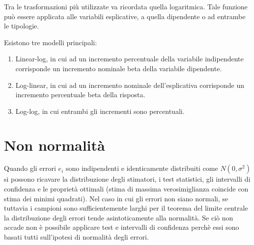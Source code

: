 \documentclass[a4page, 11pt]{article}
\begin{document}
Tra le trasformazioni più utilizzate va ricordata quella logaritmica. Tale funzione può essere applicata alle variabili esplicative, a quella dipendente o ad entrambe le tipologie. 

Esistono tre modelli principali: %
\begin{enumerate}[noitemsep]
\item Linear-log, in cui ad un incremento percentuale della variabile indipendente corrisponde un incremento nominale beta della variabile dipendente.
\item Log-linear, in cui ad un incremento nominale dell’esplicativa corrisponde un incremento percentuale beta della risposta.
\item Log-log, in cui entrambi gli incrementi sono percentuali.
\end{enumerate}

\section{Non normalità}

Quando gli errori $e_i$ sono indipendenti e identicamente distribuiti come $N(0,\sigma^{2})$ si possono ricavare la distribuzione degli stimatori, i test statistici, gli intervalli di confidenza e le proprietà ottimali (stima di massima verosimiglianza coincide con stima dei minimi quadrati). 
Nel caso in cui gli errori non siano normali, se tuttavia i campioni sono sufficientemente larghi per il teorema del limite centrale la distribuzione degli errori tende asintoticamente alla normalità. Se ciò non accade non è possibile applicare test e intervalli di confidenza perchè essi sono basati tutti sull’ipotesi di normalità degli errori.
\end{document}
